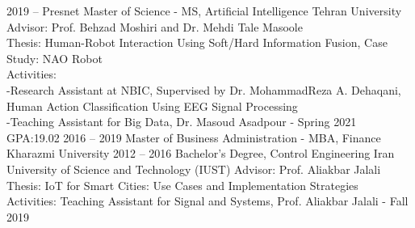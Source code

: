 \documentclass[9pt]{developercv} %
\begin{document}
\begin{entrylist}
	\entry
		{2019 -- Presnet}
		{Master of Science - MS, Artificial Intelligence}
		{Tehran University}
		{Advisor: Prof. Behzad Moshiri and Dr. Mehdi Tale Masoole
		\\Thesis: Human-Robot Interaction Using Soft/Hard Information Fusion, Case Study: NAO Robot
		\\Activities: 
		\\-Research Assistant at NBIC, Supervised by Dr. MohammadReza A. Dehaqani, Human Action Classification Using EEG Signal Processing
		\\-Teaching Assistant for Big Data, Dr. Masoud Asadpour - Spring 2021
		\\GPA:19.02
		}
	\entry
		{2016 -- 2019}
		{Master of Business Administration - MBA, Finance}
		{Kharazmi University}	
		{}
	\entry
		{2012 -- 2016}
		{Bachelor's Degree, Control Engineering}
		{Iran University of Science and Technology (IUST)}
		{Advisor: Prof. Aliakbar Jalali
		\\Thesis: IoT for Smart Cities: Use Cases and Implementation Strategies
		\\Activities: Teaching Assistant for Signal and Systems, Prof. Aliakbar Jalali - Fall 2019}
	
\end{entrylist}
\end{document}
